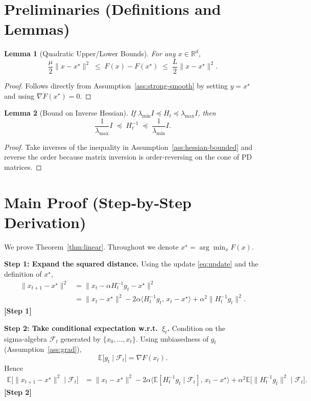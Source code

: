 \documentclass{article}
\newtheorem{lemma}{Lemma}[section]
\begin{document}
\section*{Preliminaries (Definitions and Lemmas)}
\begin{lemma}[Quadratic Upper/Lower Bounds]\label{lem:quad}
For any $x\in\mathbb{R}^d$,
\[
\frac{\mu}{2}\|x-x^\star\|^2\;\le\;F(x)-F(x^\star)\;\le\;\frac{L}{2}\|x-x^\star\|^2 .
\]
\end{lemma}
\begin{proof}
Follows directly from Assumption~\ref{ass:strong-smooth} by setting $y=x^\star$ and using $\nabla F(x^\star)=0$.
\end{proof}

\begin{lemma}[Bound on Inverse Hessian]\label{lem:hessian-inv}
If $\lambda_{\min}I\preceq H_t\preceq\lambda_{\max}I$, then
\[
\frac{1}{\lambda_{\max}} I\;\preceq\; H_t^{-1}\;\preceq\;\frac{1}{\lambda_{\min}} I .
\]
\end{lemma}
\begin{proof}
Take inverses of the inequality in Assumption~\ref{ass:hessian-bounded} and reverse the order because matrix inversion is order‑reversing on the cone of PD matrices.
\end{proof}

\section*{Main Proof (Step‑by‑Step Derivation)}
We prove Theorem~\ref{thm:linear}.  Throughout we denote $x^\star=\arg\min_x F(x)$.

\bigskip
\noindent\textbf{Step 1: Expand the squared distance.}  
Using the update \eqref{eq:update} and the definition of $x^\star$,
\begin{align}
\|x_{t+1}-x^\star\|^2
&= \Big\|x_t-\alpha H_t^{-1}g_t - x^\star\Big\|^2 \nonumber\\
&= \|x_t-x^\star\|^2
   -2\alpha\langle H_t^{-1}g_t,\,x_t-x^\star\rangle
   +\alpha^2\|H_t^{-1}g_t\|^2 .
\label{eq:expand}
\end{align}
\textbf{[Step 1]}

\bigskip
\noindent\textbf{Step 2: Take conditional expectation w.r.t.\ $\xi_t$.}  
Condition on the sigma‑algebra $\mathcal{F}_t$ generated by $\{x_0,\dots,x_t\}$.  Using unbiasedness of $g_t$ (Assumption~\ref{ass:grad}),
\[
\mathbb{E}\big[g_t\mid\mathcal{F}_t\big]=\nabla F(x_t).
\]
Hence
\begin{align}
\mathbb{E}\!\big[\|x_{t+1}-x^\star\|^2\mid\mathcal{F}_t\big]
&= \|x_t-x^\star\|^2
   -2\alpha\langle\mathbb{E}[H_t^{-1}g_t\mid\mathcal{F}_t],\,x_t-x^\star\rangle
   +\alpha^2\mathbb{E}\!\big[\|H_t^{-1}g_t\|^2\mid\mathcal{F}_t\big].
\label{eq:cond-exp}
\end{align}
\textbf{[Step 2]}
\end{document}
